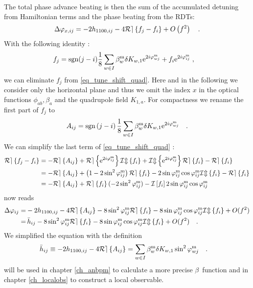 The total phase advance beating is then the sum of the accumulated detuning from Ha\-mil\-to\-nian
terms and the phase beating from the RDTs:
%
\begin{equation}
  \Delta \varphi_{x,ij} = -2h_{1100,ij} - 4\mathcal{Re} \left\{ f_{j} - f_{i} \right\} + O \left( f^2 \right)
  \quad .
  \label{eq_tune_shift_quad}
\end{equation}
%
 With the following identity \cite{Tomas2005, Franchi2007}: 
%
\begin{align}
  f_j &= \text{sgn}(j-i) \frac{1}{8}\sum\limits_{w\in I}\beta_w ^\text{m} \delta K_{w,1}
  \text{e}^{2i\varphi_{wj}^\text{m}}+f_{i}\text{e}^{2i\varphi_{ij}^\text{m}}\; ,
  \label{eq_rogelio_fjfromfi} 
\end{align}
%
we can eliminate $f_j$ from \eqref{eq_tune_shift_quad}.
Here and in the following we consider only the horizontal plane and thus we omit the index $x$ in the optical
functions $\phi_{ab}, \beta_a$ and the quadrupole field $K_{1,a}$.
For compactness we rename the first part of $f_j$ to
%
\begin{equation}
  A_{ij} = \text{sgn} \left( j-i \right) \frac{1}{8} \sum\limits_{w \in I} \beta_w^\text{m} \delta
  K_{w,1} \text{e}^{2i\varphi_{wj}^\text{m}}
  \quad .
  \label{eq_Aij}
\end{equation}
%
We can simplify the last term of \eqref{eq_tune_shift_quad} \cite{Franchi2014}:
%
\begin{align}
  \label{eq_simplify_Re(f)}
  \mathcal{Re} \left\{ f_j-f_i \right\} &= 
  -\mathcal{Re} \left\{ A_{ij} \right\} + \mathcal{Re} \left\{ \text{e}^{2i\varphi_{ij}^\text{m}} \right\}\mathcal{Im} \left\{ f_i \right\} + \mathcal{Im} \left\{ \text{e}^{2i\varphi_{ij}^\text{m}} \right\}\mathcal{Re} \left\{ f_i \right\} -
  \mathcal{Re} \left\{ f_i \right\} \notag \\ 
  &= -\mathcal{Re} \left\{ A_{ij} \right\} + \left( 1-2\sin^2\varphi_{ij}^\text{m} \right)\mathcal{Re} \left\{ f_i \right\} -
  2\sin\varphi_{ij}^\text{m} \cos\varphi_{ij}^\text{m} \mathcal{Im} \left\{ f_i \right\} - \mathcal{Re} \left\{ f_i \right\} \notag \\
  &= -\mathcal{Re} \left\{ A_{ij} \right\} + \mathcal{Re} \left\{ f_i \right\}(-2\sin^2\varphi_{ij}^\text{m}) - \mathcal{I}\left[f_i\right]2 \sin\varphi_{ij}^\text{m}\cos\varphi_{ij}^\text{m}
\end{align}
%
 now reads
%
\begin{align}
  \Delta\varphi_{ij} =& -2h_{1100,ij} - 4\mathcal{Re} \left\{ A_{ij} \right\} - 8 \sin^2\varphi_{ij}^\text{m}\mathcal{Re} \left\{ f_i \right\}
- 8\sin\varphi_{ij}^\text{m} \cos\varphi_{ij}^\text{m}\mathcal{Im} \left\{ f_i \right\}+O(f^2) \notag \\
=&\, \bar{h}_{ij} - 8 \sin^2\varphi_{ij}^\text{m}\mathcal{Re} \left\{ f_i \right\} - 8\sin\varphi_{ij}^\text{m} \cos\varphi_{ij}^\text{m}\mathcal{Im} \left\{ f_i \right\} 
 +O(f^2)
\quad .
\label{eq_phasebeating_1st_app}
\end{align}
%
We simplified the equation with the definition
%
\begin{align}
  \bar{h}_{ij} &\equiv -2h_{1100,ij} - 4\mathcal{Re} \left\{ A_{ij} \right\} 
= \sum\limits_{w \in I}\beta_w^\text{m} \delta K_{w,1}\sin ^ 2 \varphi_{wj}^\text{m}\quad .
\label{eq_hbar_app}
\end{align}
%
 will be used in chapter \ref{ch_anbpm} to calculate a more
precise $\beta$~function and in chapter \ref{ch_localobs} to construct a local observable.

